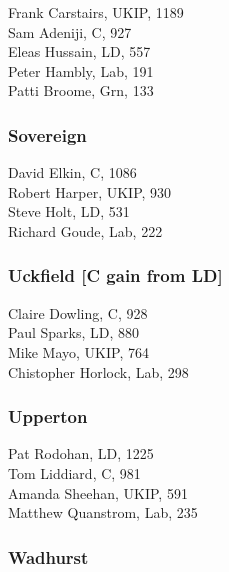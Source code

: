 \documentclass[a4paper,openany,10pt]{book}
\begin{document}


Frank Carstairs, UKIP, 1189\\
Sam Adeniji, C, 927\\
Eleas Hussain, LD, 557\\
Peter Hambly, Lab, 191\\
Patti Broome, Grn, 133\\


\subsubsection*{Sovereign}



David Elkin, C, 1086\\
Robert Harper, UKIP, 930\\
Steve Holt, LD, 531\\
Richard Goude, Lab, 222\\


\subsubsection*{Uckfield \hspace*{\fill}\nolinebreak[1]%
\enspace\hspace*{\fill}
[C gain from LD]}



Claire Dowling, C, 928\\
Paul Sparks, LD, 880\\
Mike Mayo, UKIP, 764\\
Chistopher Horlock, Lab, 298\\


\subsubsection*{Upperton}



Pat Rodohan, LD, 1225\\
Tom Liddiard, C, 981\\
Amanda Sheehan, UKIP, 591\\
Matthew Quanstrom, Lab, 235\\


\subsubsection*{Wadhurst}
\end{document}
